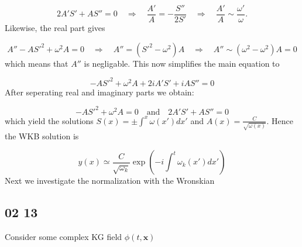 \begin{equation*}
    2A'S' + AS'' = 0 \quad \Rightarrow \quad \frac{A'}{A} = -\frac{S''}{2 S'} \quad \Rightarrow \quad \frac{A'}{A} \sim \frac{\omega'}{\omega}.
\end{equation*}
Likewise, the real part gives

\begin{equation*}
    A'' - AS'^2 + \omega^2 A = 0 \quad \Rightarrow \quad A'' = (S'^2 - \omega^2) A \quad \Rightarrow \quad A'' \sim (\omega^2 - \omega^2) A = 0
\end{equation*}
which means that $A''$ is negligable. This now simplifies the main equation to

\begin{equation*}
    -AS'^2 + \omega^2 A + 2iA' S' + iAS'' = 0
\end{equation*}
After seperating real and imaginary parts we obtain:

\begin{equation*}
    -AS'^2 + \omega^2 A = 0 \quad \text{and} \quad 2 A' S' + A S'' = 0 
\end{equation*}
which yield the solutions $S(x) = \pm \int^x \omega(x') dx'$ and $A(x) = \frac{C}{\sqrt{\omega(x)}}$. Hence the WKB solution is

\begin{equation}\label{eq: WKB mathematical solution}
    y(x) \simeq \frac{C}{\sqrt{\omega_k}} \exp(-i \int^t \omega_k(x') dx')
\end{equation}
Next we investigate the normalization with the Wronskian


\subsection*{02 13}

Consider some complex KG field $\hat{\phi}(t, \bm{x})$

